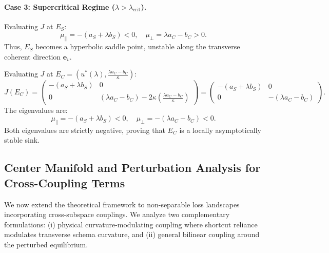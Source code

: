\documentclass{article}
\theoremstyle{plain}
\theoremstyle{definition}
\begin{document}
\paragraph{Case 3: Supercritical Regime ($\lambda > \lambda_{\text{crit}}$).}
Evaluating $J$ at $E_S$:
\begin{equation}
    \mu_{\parallel} = -(a_S + \lambda b_S) < 0, \quad \mu_{\perp} = \lambda a_C - b_C > 0.
\end{equation}
Thus, $E_S$ becomes a hyperbolic saddle point, unstable along the transverse coherent direction $\mathbf{e}_v$.

Evaluating $J$ at $E_C = \left( u^*(\lambda), \frac{\lambda a_C - b_C}{\kappa} \right)$:
\begin{equation}
    J(E_C) = \begin{pmatrix}
        -(a_S + \lambda b_S) & 0 \\
        0 & (\lambda a_C - b_C) - 2\kappa \left( \frac{\lambda a_C - b_C}{\kappa} \right)
    \end{pmatrix} = \begin{pmatrix}
        -(a_S + \lambda b_S) & 0 \\
        0 & -(\lambda a_C - b_C)
    \end{pmatrix}.
\end{equation}
The eigenvalues are:
\begin{equation}
    \mu_{\parallel} = -(a_S + \lambda b_S) < 0, \quad \mu_{\perp} = -(\lambda a_C - b_C) < 0.
\end{equation}
Both eigenvalues are strictly negative, proving that $E_C$ is a locally asymptotically stable sink.

\subsection{Center Manifold and Perturbation Analysis for Cross-Coupling Terms}
\label{sec:app_center_manifold}
We now extend the theoretical framework to non-separable loss landscapes incorporating cross-subspace couplings. We analyze two complementary formulations: (i) physical curvature-modulating coupling where shortcut reliance modulates transverse schema curvature, and (ii) general bilinear coupling around the perturbed equilibrium.
\end{document}

